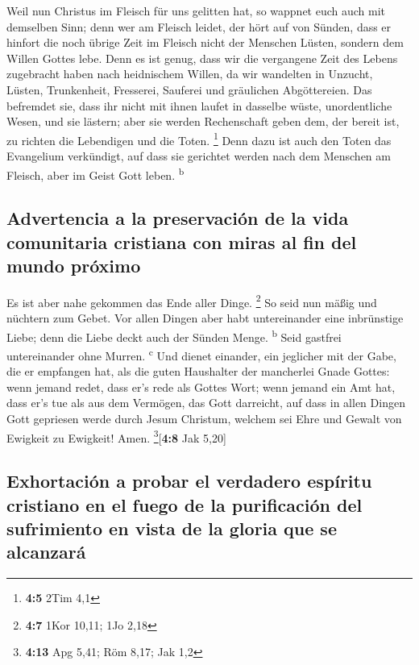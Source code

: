  Weil nun Christus im Fleisch für uns gelitten hat, so
wappnet euch auch mit demselben Sinn; denn wer am Fleisch leidet, der
hört auf von Sünden,  dass er hinfort die noch übrige Zeit
im Fleisch nicht der Menschen Lüsten, sondern dem Willen Gottes lebe.
 Denn es ist genug, dass wir die vergangene Zeit des
Lebens zugebracht haben nach heidnischem Willen, da wir wandelten in
Unzucht, Lüsten, Trunkenheit, Fresserei, Sauferei und gräulichen
Abgöttereien.  Das befremdet sie, dass ihr nicht mit ihnen
laufet in dasselbe wüste, unordentliche Wesen, und sie lästern;
 aber sie werden Rechenschaft geben dem, der bereit ist,
zu richten die Lebendigen und die Toten. \footnote{\textbf{4:5} 2Tim 4,1}
 Denn dazu ist auch den Toten das Evangelium verkündigt,
auf dass sie gerichtet werden nach dem Menschen am Fleisch, aber im
Geist Gott leben. \textsuperscript{b}

\hypertarget{advertencia-a-la-preservaciuxf3n-de-la-vida-comunitaria-cristiana-con-miras-al-fin-del-mundo-pruxf3ximo}{%
\subsection{Advertencia a la preservación de la vida comunitaria
cristiana con miras al fin del mundo
próximo}\label{advertencia-a-la-preservaciuxf3n-de-la-vida-comunitaria-cristiana-con-miras-al-fin-del-mundo-pruxf3ximo}}

 Es ist aber nahe gekommen das Ende aller Dinge.
\footnote{\textbf{4:7} 1Kor 10,11; 1Jo 2,18}  So seid nun
mäßig und nüchtern zum Gebet. Vor allen Dingen aber habt untereinander
eine inbrünstige Liebe; denn die Liebe deckt auch der Sünden Menge.
\textsuperscript{b}  Seid gastfrei untereinander ohne
Murren. \textsuperscript{c}  Und dienet einander, ein
jeglicher mit der Gabe, die er empfangen hat, als die guten Haushalter
der mancherlei Gnade Gottes:  wenn jemand redet, dass
er's rede als Gottes Wort; wenn jemand ein Amt hat, dass er's tue als
aus dem Vermögen, das Gott darreicht, auf dass in allen Dingen Gott
gepriesen werde durch Jesum Christum, welchem sei Ehre und Gewalt von
Ewigkeit zu Ewigkeit! Amen. \footnote{\textbf{4:13} Apg 5,41; Röm 8,17;
  Jak 1,2}{[}\textbf{4:8} Jak 5,20{]}

\hypertarget{exhortaciuxf3n-a-probar-el-verdadero-espuxedritu-cristiano-en-el-fuego-de-la-purificaciuxf3n-del-sufrimiento-en-vista-de-la-gloria-que-se-alcanzaruxe1}{%
\subsection{Exhortación a probar el verdadero espíritu cristiano en el
fuego de la purificación del sufrimiento en vista de la gloria que se
alcanzará}\label{exhortaciuxf3n-a-probar-el-verdadero-espuxedritu-cristiano-en-el-fuego-de-la-purificaciuxf3n-del-sufrimiento-en-vista-de-la-gloria-que-se-alcanzaruxe1}}

